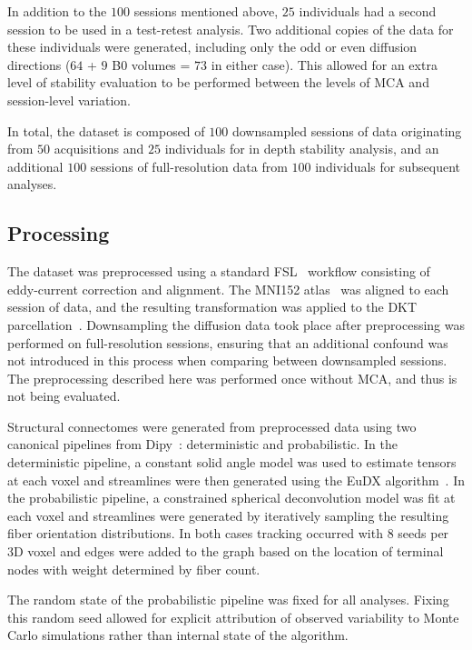 \documentclass[fleqn,10pt]{SelfArx} %
\begin{document}
In addition to the $100$ sessions mentioned above, $25$ individuals had a second session to be used in a test-retest
analysis. Two additional copies of the data for these individuals were generated, including only the odd or even
diffusion directions ($64$ + $9$ B0 volumes = $73$ in either case). This allowed for an extra level of stability
evaluation to be performed between the levels of MCA and session-level variation.

In total, the dataset is composed of $100$ downsampled sessions of data originating from $50$ acquisitions
and $25$ individuals for in depth stability analysis, and an additional $100$ sessions of full-resolution data from
$100$ individuals for subsequent analyses.


\subsection*{Processing}
The dataset was preprocessed using a standard FSL~\cite{Jenkinson2012-ly} workflow consisting of eddy-current
correction and alignment. The MNI152 atlas~\cite{lancaster2007bias} was aligned to each session of data, and the
resulting transformation was applied to the DKT parcellation~\cite{Klein2012-vi}. Downsampling the diffusion data took
place after preprocessing was performed on full-resolution sessions, ensuring that an additional confound was not
introduced in this process when comparing between downsampled sessions. The preprocessing described here was performed
once without MCA, and thus is not being evaluated.

Structural connectomes were generated from preprocessed data using two canonical pipelines from
Dipy~\cite{Garyfallidis2014-ql}: deterministic and probabilistic. In the deterministic pipeline, a constant solid angle
model was used to estimate tensors at each voxel and streamlines were then generated using the EuDX
algorithm~\cite{Garyfallidis2012-gg}. In the probabilistic pipeline, a constrained spherical deconvolution model was
fit at each voxel and streamlines were generated by iteratively sampling the resulting fiber orientation distributions.
In both cases tracking occurred with $8$ seeds per 3D voxel and edges were added to the graph based on the location of
terminal nodes with weight determined by fiber count.

The random state of the probabilistic pipeline was fixed for all analyses. Fixing this random seed allowed for explicit
attribution of observed variability to Monte Carlo simulations rather than internal state of the algorithm.
\end{document}
